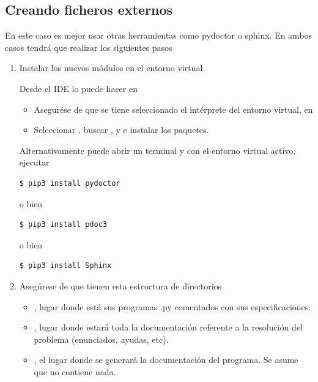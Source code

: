 \subsection{Creando ficheros externos} En este caso es mejor usar otras herramientas como pydoctor o sphinx.
En ambos casos tendrá que realizar los siguientes pasos

\begin{enumerate}[nosep]

\item Instalar los nuevos módulos en el entorno virtual.

Desde el IDE lo puede hacer en 
	\begin{itemize}
	\item Asegurése de que se tiene seleccionado el intérprete del entorno virtual, en 
	\item Seleccionar \keys{\mbox{+}}, buscar  ,  y  e instalar los paquetes.
	\end{itemize}


Alternativamente puede abrir un terminal y con el entorno virtual activo, ejecutar
\begin{Verbatim}
$ pip3 install pydoctor
\end{Verbatim}
o bien
\begin{Verbatim}
$ pip3 install pdoc3
\end{Verbatim}
o bien
\begin{Verbatim}
$ pip3 install Sphinx
\end{Verbatim}


\item Asegúrese de que tienen esta estructura de directorios 
		\begin{itemize}
		\item[] , lugar donde está sus programas .py comentados con sus especificaciones.
		\item[] , lugar donde estará toda la documentación referente a la resolución del problema (enunciados, ayudas, etc).
		\item[] , el lugar donde se generará la documentación del programa. Se asume que no contiene nada.
		\end{itemize}
\end{enumerate}


